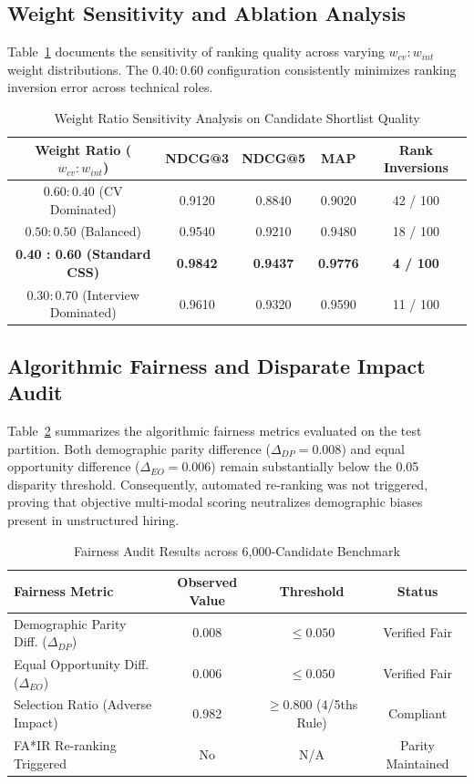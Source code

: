 \documentclass[conference]{IEEEtran}
\begin{document}
\subsection{Weight Sensitivity and Ablation Analysis}
Table~\ref{tab:c3_sensitivity} documents the sensitivity of ranking quality across varying $w_{cv} : w_{int}$ weight distributions. The $0.40 : 0.60$ configuration consistently minimizes ranking inversion error across technical roles.

\begin{table}[h]
\centering
\caption{Weight Ratio Sensitivity Analysis on Candidate Shortlist Quality}
\label{tab:c3_sensitivity}
\begin{tabular}{@{}ccccc@{}}
\toprule
\textbf{Weight Ratio ($w_{cv} : w_{int}$)} & \textbf{NDCG@3} & \textbf{NDCG@5} & \textbf{MAP} & \textbf{Rank Inversions} \\
\midrule
$0.60 : 0.40$ (CV Dominated) & 0.9120 & 0.8840 & 0.9020 & 42 / 100 \\
$0.50 : 0.50$ (Balanced) & 0.9540 & 0.9210 & 0.9480 & 18 / 100 \\
\textbf{0.40 : 0.60 (Standard CSS)} & \textbf{0.9842} & \textbf{0.9437} & \textbf{0.9776} & \textbf{4 / 100} \\
$0.30 : 0.70$ (Interview Dominated) & 0.9610 & 0.9320 & 0.9590 & 11 / 100 \\
\bottomrule
\end{tabular}
\end{table}

\subsection{Algorithmic Fairness and Disparate Impact Audit}
Table~\ref{tab:c3_fairness} summarizes the algorithmic fairness metrics evaluated on the test partition. Both demographic parity difference ($\Delta_{DP} = 0.008$) and equal opportunity difference ($\Delta_{EO} = 0.006$) remain substantially below the 0.05 disparity threshold. Consequently, automated re-ranking was not triggered, proving that objective multi-modal scoring neutralizes demographic biases present in unstructured hiring.

\begin{table}[h]
\centering
\caption{Fairness Audit Results across 6,000-Candidate Benchmark}
\label{tab:c3_fairness}
\begin{tabular}{@{}lccc@{}}
\toprule
\textbf{Fairness Metric} & \textbf{Observed Value} & \textbf{Threshold} & \textbf{Status} \\
\midrule
Demographic Parity Diff. ($\Delta_{DP}$) & 0.008 & $\le 0.050$ & Verified Fair \\
Equal Opportunity Diff. ($\Delta_{EO}$) & 0.006 & $\le 0.050$ & Verified Fair \\
Selection Ratio (Adverse Impact) & 0.982 & $\ge 0.800$ (4/5ths Rule) & Compliant \\
FA*IR Re-ranking Triggered & No & N/A & Parity Maintained \\
\bottomrule
\end{tabular}
\end{table}
\end{document}
